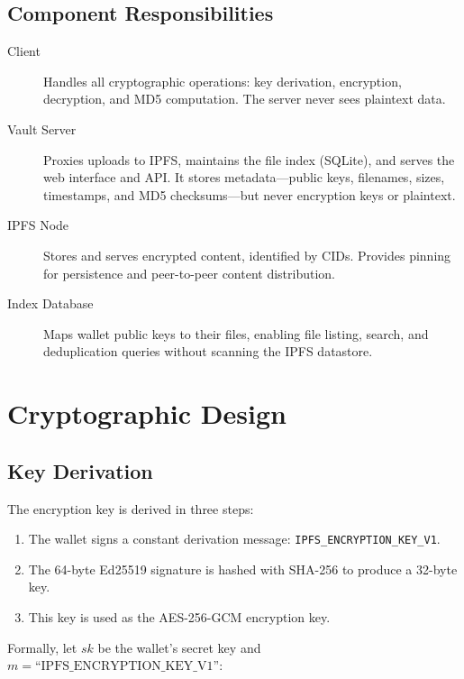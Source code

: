 \documentclass[11pt,a4paper]{article}
\begin{document}
\subsection{Component Responsibilities}

\begin{description}
    \item[Client] Handles all cryptographic operations: key derivation, encryption, decryption, and MD5 computation. The server never sees plaintext data.
    \item[Vault Server] Proxies uploads to IPFS, maintains the file index (SQLite), and serves the web interface and API. It stores metadata---public keys, filenames, sizes, timestamps, and MD5 checksums---but never encryption keys or plaintext.
    \item[IPFS Node] Stores and serves encrypted content, identified by CIDs. Provides pinning for persistence and peer-to-peer content distribution.
    \item[Index Database] Maps wallet public keys to their files, enabling file listing, search, and deduplication queries without scanning the IPFS datastore.
\end{description}

\section{Cryptographic Design}

\subsection{Key Derivation}

The encryption key is derived in three steps:

\begin{enumerate}
    \item The wallet signs a constant derivation message: \texttt{IPFS\_ENCRYPTION\_KEY\_V1}.
    \item The 64-byte Ed25519 signature is hashed with SHA-256 to produce a 32-byte key.
    \item This key is used as the AES-256-GCM encryption key.
\end{enumerate}

Formally, let $sk$ be the wallet's secret key and $m = \text{``IPFS\_ENCRYPTION\_KEY\_V1''}$:
\end{document}
